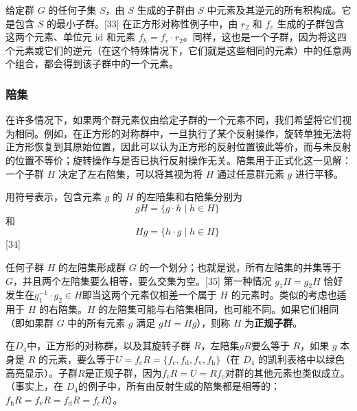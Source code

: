 给定群 \( G \) 的任何子集 \( S \)，由 \( S \) 生成的子群由 \( S \) 中元素及其逆元的所有积构成。它是包含 \( S \) 的最小子群。[33] 在正方形对称性例子中，由 \( r_2 \) 和 \( f_v \) 生成的子群包含这两个元素、单位元 \( \text{id} \) 和元素 \( f_h = f_v \cdot r_2 \)。同样，这也是一个子群，因为将这四个元素或它们的逆元（在这个特殊情况下，它们就是这些相同的元素）中的任意两个组合，都会得到该子群中的一个元素。
\subsubsection{陪集}
在许多情况下，如果两个群元素仅由给定子群的一个元素不同，我们希望将它们视为相同。例如，在正方形的对称群中，一旦执行了某个反射操作，旋转单独无法将正方形恢复到其原始位置，因此可以认为正方形的反射位置彼此等价，而与未反射的位置不等价；旋转操作与是否已执行反射操作无关。陪集用于正式化这一见解：一个子群 \( H \) 决定了左右陪集，可以将其视为将 \( H \) 通过任意群元素 \( g \) 进行平移。  

用符号表示，包含元素 \( g \) 的 \( H \) 的左陪集和右陪集分别为  
\[
gH = \{ g \cdot h \mid h \in H \}~
\]
和  
\[
Hg = \{ h \cdot g \mid h \in H \}~
\][34]

任何子群 \( H \) 的左陪集形成群 \( G \) 的一个划分；也就是说，所有左陪集的并集等于 \( G \)，并且两个左陪集要么相等，要么交集为空。[35] 第一种情况 \( g_1 H = g_2 H \) 恰好发生在\(g_1^{-1} \cdot g_2 \in H\)即当这两个元素仅相差一个属于 \( H \) 的元素时。类似的考虑也适用于 \( H \) 的右陪集。\( H \) 的左陪集可能与右陪集相同，也可能不同。如果它们相同（即如果群 \( G \) 中的所有元素 \( g \) 满足 \( gH = Hg \)），则称 \( H \) 为\textbf{正规子群}。

在\( D_4 \)中，正方形的对称群，以及其旋转子群 \( R \)，左陪集\( gR \)要么等于 \( R \)，如果 \( g \) 本身是 \( R \) 的元素，要么等于\(U = f_{\mathrm{c}} R = \{ f_{\mathrm{c}}, f_{\mathrm{d}},f_{\mathrm{v}}, f_{\mathrm{h}}\}\)（在 \( D_4 \) 的凯利表格中以绿色高亮显示）。子群\( R \)是正规子群，因为\(f_{\mathrm{c}} R = U = R f_{\mathrm{c}}\)对群的其他元素也类似成立。（事实上，在 \( D_4 \)的例子中，所有由反射生成的陪集都是相等的：\(f_{\mathrm{h}}R = f_{\mathrm{v}} R = f_{\mathrm{d}}R = f_{\mathrm{c}} R\)）。
